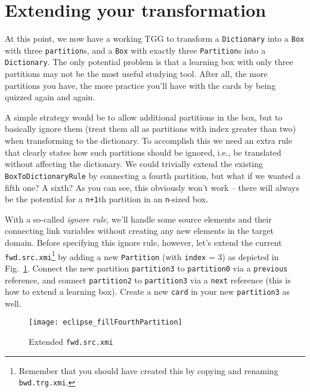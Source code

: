 \section{Extending your transformation}
\genHeader

At this point, we now have a working TGG to transform a \texttt{Dictionary} into a \texttt{Box} with three \texttt{partition}s, and a \texttt{Box} with exactly three \texttt{Partition}s into a \texttt{Dictionary}. 
The only potential problem is that a learning box with only three partitions may not be the most useful studying tool. 
After all, the more partitions you have, the more practice you'll have with the cards by being quizzed again and again.

A simple strategy would be to allow additional partitions in the box, but to basically ignore them (treat them all as partitions with index greater than two) when transforming to the dictionary. 
To accomplish this we need an extra rule that clearly states how such partitions should be ignored, i.e., be translated without affecting the dictionary. 
We could trivially extend the existing \texttt{BoxToDictionaryRule} by connecting a fourth partition, but what if we wanted a fifth one? A sixth? As you can see, this obviously won't work -- there will always be the potential for a \texttt{n+1}th partition in an \texttt{n}-sized box. 

With a so-called \emph{ignore rule}, we'll handle some source elements and their connecting link variables without creating any new elements in the target domain.
%
Before specifying this ignore rule, however, let's extend the current \texttt{fwd.src.xmi}\footnote{Remember that you should have created this by copying and renaming \texttt{bwd.trg.xmi}.} by adding a new \texttt{Partition} (with \texttt{index} = 3) as depicted in Fig.~\ref{fig:ea_extended_fwd_src_xmi}.
Connect the new partition \texttt{partition3}  to \texttt{partition0} via a \texttt{previous} reference, and connect \texttt{partition2} to \texttt{partition3} via a \texttt{next} reference (this is how to extend a learning box).
Create a new \texttt{card} in your new \texttt{partition3} as well.

\begin{figure}[htbp]
\begin{center}
  \texttt{[image: eclipse\_fillFourthPartition]}
  \caption{Extended \texttt{fwd.src.xmi}}
  \label{fig:ea_extended_fwd_src_xmi}
\end{center}
\end{figure}


